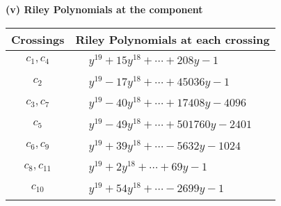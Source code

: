 \documentclass[1p]{elsarticle_modified}
\theoremstyle{definition}
\begin{document}
\flushleft \textbf{(v) Riley Polynomials at the component}\newline \\
\begin{tabular}{m{50pt}|m{274pt}}
Crossings & \hspace{64pt}Riley Polynomials at each crossing \\
\hline $$\begin{aligned}c_{1},c_{4}\end{aligned}$$&$\begin{aligned}
&y^{19}+15 y^{18}+\cdots+208 y-1
\end{aligned}$\\
\hline $$\begin{aligned}c_{2}\end{aligned}$$&$\begin{aligned}
&y^{19}-17 y^{18}+\cdots+45036 y-1
\end{aligned}$\\
\hline $$\begin{aligned}c_{3},c_{7}\end{aligned}$$&$\begin{aligned}
&y^{19}-40 y^{18}+\cdots+17408 y-4096
\end{aligned}$\\
\hline $$\begin{aligned}c_{5}\end{aligned}$$&$\begin{aligned}
&y^{19}-49 y^{18}+\cdots+501760 y-2401
\end{aligned}$\\
\hline $$\begin{aligned}c_{6},c_{9}\end{aligned}$$&$\begin{aligned}
&y^{19}+39 y^{18}+\cdots-5632 y-1024
\end{aligned}$\\
\hline $$\begin{aligned}c_{8},c_{11}\end{aligned}$$&$\begin{aligned}
&y^{19}+2 y^{18}+\cdots+69 y-1
\end{aligned}$\\
\hline $$\begin{aligned}c_{10}\end{aligned}$$&$\begin{aligned}
&y^{19}+54 y^{18}+\cdots-2699 y-1
\end{aligned}$\\
\hline
\end{tabular}\\~\\
\end{document}

